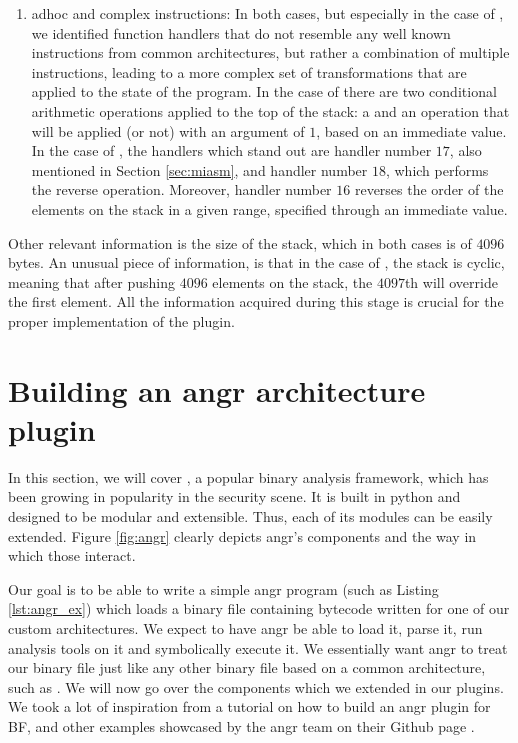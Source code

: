 \begin{enumerate}
    \item adhoc and complex instructions: In both cases, but especially in the case of , we identified function handlers that do not resemble any well known instructions from common architectures, but rather a combination of multiple instructions, leading to a more complex set of transformations that are applied to the state of the program. In the case of  there are two conditional arithmetic operations applied to the top of the stack: a  and an  operation that will be applied (or not) with an argument of $1$, based on an immediate value. In the case of , the handlers which stand out are handler number $17$, also mentioned in Section \ref{sec:miasm}, and handler number $18$, which performs the reverse operation. Moreover, handler number $16$ reverses the order of the elements on the stack in a given range, specified through an immediate value.
\end{enumerate} 

Other relevant information is the size of the stack, which in both cases is of $4096$ bytes. An unusual piece of information, is that in the case of , the stack is cyclic, meaning that after pushing $4096$ elements on the stack, the $4097$th will override the first element. All the information acquired during this stage is crucial for the proper implementation of the  plugin.

\section{Building an angr architecture plugin}

In this section, we will cover  \cite{angr}, a popular binary analysis framework, which has been growing in popularity in the security scene. It is built in python and designed to be modular and extensible. Thus, each of its modules can be easily extended. Figure \ref{fig:angr} clearly depicts angr's components and the way in which those interact. 

Our goal is to be able to write a simple angr program (such as Listing \ref{lst:angr_ex}) which loads a binary file containing bytecode written for one of our custom architectures. We expect to have angr be able to load it, parse it, run analysis tools on it and symbolically execute it. We essentially want angr to treat our binary file just like any other binary file based on a common architecture, such as . We will now go over the components which we extended in our plugins. We took a lot of inspiration from a tutorial on how to build an angr plugin for \gls{BF}, and other examples showcased by the angr team on their Github page \cite{angr_tut}.

